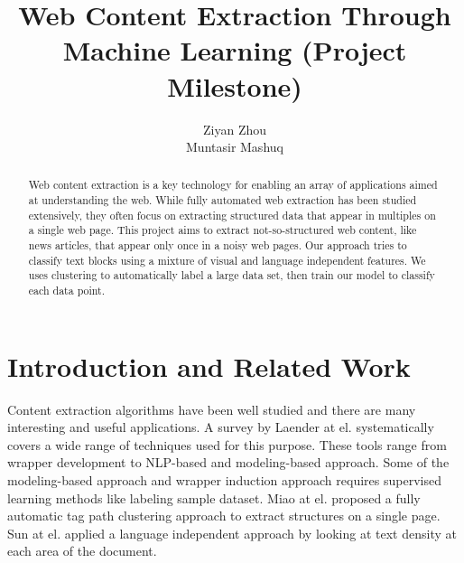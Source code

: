 \documentclass{acm_proc_article-sp}
\begin{document}
\title{Web Content Extraction Through Machine Learning (Project Milestone)
}

\author{
\alignauthor
Ziyan Zhou\\
\alignauthor
Muntasir Mashuq\\
}

\maketitle

\begin{abstract}
Web content extraction is a key technology for enabling an array of applications aimed at understanding the web. While fully automated web extraction has been studied extensively, they often focus on extracting structured data that appear in multiples on a single web page. This project aims to extract not-so-structured web content, like news articles, that appear only once in a noisy web pages. Our approach tries to classify text blocks using a mixture of visual and language independent features. We uses clustering to automatically label a large data set, then train our model to classify each data point.
\end{abstract}


\section{Introduction and Related Work}

Content extraction algorithms have been well studied and there are many interesting and useful applications\cite{diffbot}\cite{readability}. A survey by Laender at el.\cite{laender:brief} systematically covers a wide range of techniques used for this purpose. These tools range from wrapper development to NLP-based and modeling-based approach. Some of the modeling-based approach and wrapper induction approach requires supervised learning methods like labeling sample dataset. Miao at el.\cite{gengxin:extracting} proposed a fully automatic tag path clustering approach to extract structures on a single page. Sun at el.\cite{sun2011dom} applied a language independent approach by looking at text density at each area of the document.
\end{document}
